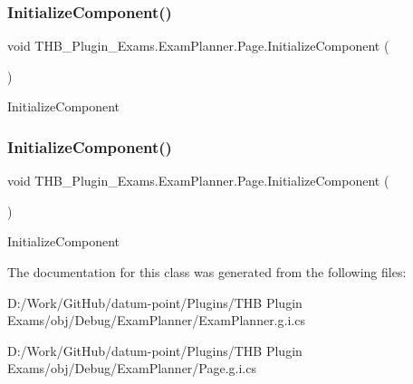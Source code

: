 \subsubsection{\texorpdfstring{Initialize\+Component()}{InitializeComponent()}\hspace{0.1cm}{\footnotesize\ttfamily [1/2]}}
{\footnotesize\ttfamily void T\+H\+B\+\_\+\+Plugin\+\_\+\+Exams.\+Exam\+Planner.\+Page.\+Initialize\+Component (\begin{DoxyParamCaption}{ }\end{DoxyParamCaption})}



Initialize\+Component 

\mbox{\label{class_t_h_b___plugin___exams_1_1_exam_planner_1_1_page_a847df3ab7efff49dde2471c64a8ea0b7}} 
\subsubsection{\texorpdfstring{Initialize\+Component()}{InitializeComponent()}\hspace{0.1cm}{\footnotesize\ttfamily [2/2]}}
{\footnotesize\ttfamily void T\+H\+B\+\_\+\+Plugin\+\_\+\+Exams.\+Exam\+Planner.\+Page.\+Initialize\+Component (\begin{DoxyParamCaption}{ }\end{DoxyParamCaption})}



Initialize\+Component 



The documentation for this class was generated from the following files\+:\begin{DoxyCompactItemize}
\item 
D\+:/\+Work/\+Git\+Hub/datum-\/point/\+Plugins/\+T\+H\+B Plugin Exams/obj/\+Debug/\+Exam\+Planner/Exam\+Planner.\+g.\+i.\+cs\item 
D\+:/\+Work/\+Git\+Hub/datum-\/point/\+Plugins/\+T\+H\+B Plugin Exams/obj/\+Debug/\+Exam\+Planner/Page.\+g.\+i.\+cs\end{DoxyCompactItemize}
